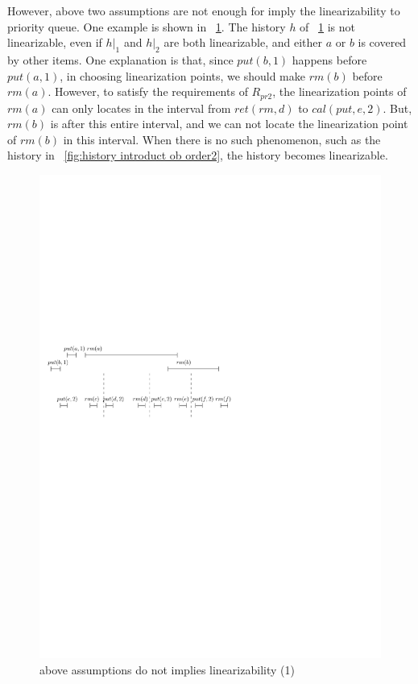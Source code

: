 \documentclass{llncs}
\begin{document}
However, above two assumptions are not enough for imply the linearizability to priority queue. One example is shown in \figurename~\ref{fig:history introduct ob order1}. The history $h$ of \figurename~\ref{fig:history introduct ob order1} is not linearizable, even if $h \vert_{1}$ and $h \vert_{2}$ are both linearizable, and either $a$ or $b$ is covered by other items. One explanation is that, since $\textit{put}(b,1)$ happens before $\textit{put}(a,1)$, in choosing linearization points, we should make $\textit{rm}(b)$ before $\textit{rm}(a)$. However, to satisfy the requirements of $R_{\textit{pr2}}$, the linearization points of $\textit{rm}(a)$ can only locates in the interval from $\textit{ret}(\textit{rm},d)$ to $\textit{cal}(\textit{put},e,2)$. But, $\textit{rm}(b)$ is after this entire interval, and we can not locate the linearization point of $\textit{rm}(b)$ in this interval. When there is no such phenomenon, such as the history in \figurename~\ref{fig:history introduct ob order2}, the history becomes linearizable.

\begin{figure}[htbp]
  \centering
  \includegraphics[width=0.6 \textwidth]{PIC-HIS-INTRO-OB-ORDER1.pdf}
  \caption{above assumptions do not implies linearizability (1)}
  \label{fig:history introduct ob order1}
\end{figure}


\end{document}
